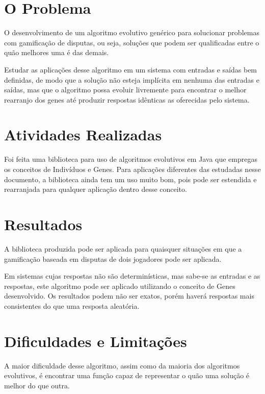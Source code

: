 \section{O Problema}

O desenvolvimento de um algoritmo evolutivo genérico para solucionar problemas com gamificação de disputas, ou seja, soluções que podem ser qualificadas entre o quão melhores uma é das demais.

Estudar as aplicações desse algoritmo em um sistema com entradas e saídas bem definidas, de modo que a solução não esteja implícita em nenhuma das entradas e saídas, mas que o algoritmo possa evoluir livremente para encontrar o melhor rearranjo dos genes até produzir respostas idênticas as oferecidas pelo sistema.

\section{Atividades Realizadas}

Foi feita uma biblioteca para uso de algoritmos evolutivos em Java que empregas os conceitos de Indivíduos e Genes. Para aplicações diferentes das estudadas nesse documento, a biblioteca ainda tem um uso muito bom, pois pode ser estendida e rearranjada para qualquer aplicação dentro desse conceito.

\section{Resultados}

A biblioteca produzida pode ser aplicada para quaisquer situações em que a gamificação baseada em disputas de dois jogadores pode ser aplicada.

Em sistemas cujas respostas não são determinísticas, mas sabe-se as entradas e as respostas, este algoritmo pode ser aplicado utilizando o conceito de Genes desenvolvido. Os resultados podem não ser exatos, porém haverá respostas mais consistentes do que uma resposta aleatória.

\section{Dificuldades e Limitações}

A maior dificuldade desse algoritmo, assim como da maioria dos algoritmos evolutivos, é encontrar uma função \fitness capaz de representar o quão uma solução é melhor do que outra.